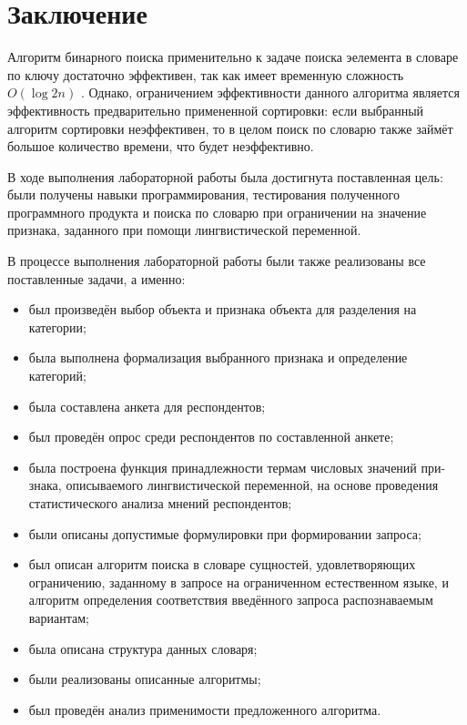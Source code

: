 \chapter*{Заключение}
Алгоритм бинарного поиска применительно к задаче поиска эелемента в словаре по ключу достаточно эффективен, так как имеет временную сложность $O(\log{2}n)$ \cite{item11}. Однако, ограничением эффективности данного алгоритма является эффективность предварительно примененной сортировки: если выбранный алгоритм сортировки неэффективен, то в целом поиск по словарю также займёт большое количество времени, что будет неэффективно.

В ходе выполнения лабораторной работы была достигнута поставленная цель: были получены навыки программирования, тестирования полученного программного продукта и поиска по словарю при ограничении на значение признака, заданного при помощи лингвистической переменной.

В процессе выполнения лабораторной работы были также реализованы все поставленные задачи, а именно:
\begin{itemize}
	\item был произведён выбор объекта и признака объекта для разделения на категории;
	\item была выполнена формализация выбранного признака и определение категорий;
	\item была составлена анкета для респондентов;
	\item был проведён опрос среди респондентов по составленной анкете;
	\item была построена функция принадлежности термам числовых значений при- знака, описываемого лингвистической переменной, на основе проведения статистического анализа мнений респондентов;
	\item были описаны допустимые формулировки при формировании запроса;
	\item был описан алгоритм поиска в словаре сущностей, удовлетворяющих ограничению, заданному в запросе на ограниченном естественном языке, и алгоритм определения соответствия введённого запроса распознаваемым вариантам; 
	\item была описана структура данных словаря;
	\item были реализованы описанные алгоритмы;
	\item был проведён анализ применимости предложенного алгоритма.
\end{itemize}

\newpage